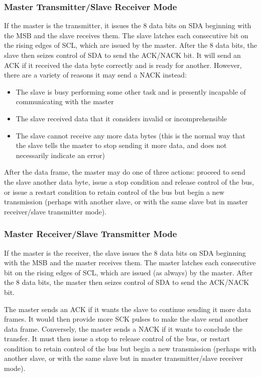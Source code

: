 \subsubsection{Master Transmitter/Slave Receiver Mode}

If the master is the transmitter, it issues the 8 data bits on SDA beginning with the MSB and the slave receives them. The slave latches each consecutive bit on the rising edges of SCL, which are issued by the master. After the 8 data bits, the slave then seizes control of SDA to send the ACK/NACK bit. It will send an ACK if it received the data byte correctly and is ready for another. However, there are a variety of reasons it may send a NACK instead:
\begin{itemize}
	\item The slave is busy performing some other task and is presently incapable of communicating with the master
	\item The slave received data that it considers invalid or incomprehensible
	\item The slave cannot receive any more data bytes (this is the normal way that the slave tells the master to stop sending it more data, and does not necessarily indicate an error)
\end{itemize}

After the data frame, the master may do one of three actions: proceed to send the slave another data byte, issue a stop condition and release control of the bus, or issue a restart condition to retain control of the bus but begin a new transmission (perhaps with another slave, or with the same slave but in master receiver/slave transmitter mode).

\subsubsection{Master Receiver/Slave Transmitter Mode}

If the master is the receiver, the slave issues the 8 data bits on SDA beginning with the MSB and the master receives them. The master latches each consecutive bit on the rising edges of SCL, which are issued (as always) by the master. After the 8 data bits, the master then seizes control of SDA to send the ACK/NACK bit.

The master sends an ACK if it wants the slave to continue sending it more data frames. It would then provide more SCK pulses to make the slave send another data frame. Conversely, the master sends a NACK if it wants to conclude the transfer. It must then issue a stop to release control of the bus, or restart condition to retain control of the bus but begin a new transmission (perhaps with another slave, or with the same slave but in master transmitter/slave receiver mode).



